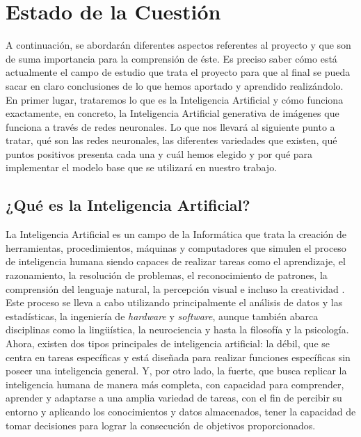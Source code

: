 \chapter{Estado de la Cuestión}
\label{cap:estadoDeLaCuestion}


A continuación, se abordarán diferentes aspectos referentes al proyecto y que son de suma importancia para la comprensión de éste. Es preciso saber cómo está actualmente el campo de estudio que trata el proyecto para que al final se pueda sacar en claro conclusiones de lo que hemos aportado y aprendido realizándolo.\\ 

En primer lugar, trataremos lo que es la Inteligencia Artificial y cómo funciona exactamente, en concreto, la Inteligencia Artificial generativa de imágenes que funciona a través de redes neuronales. Lo que nos llevará al siguiente punto a tratar, qué son las redes neuronales, las diferentes variedades que existen, qué puntos positivos presenta cada una y cuál hemos elegido y por qué para implementar el modelo base que se utilizará en nuestro trabajo. \\


\section{¿Qué es la Inteligencia Artificial?}

La Inteligencia Artificial es un campo de la Informática que trata la creación de herramientas, procedimientos, máquinas y computadores que simulen el proceso de inteligencia humana siendo capaces de realizar tareas como el aprendizaje, el razonamiento, la resolución de problemas, el reconocimiento de patrones, la comprensión del lenguaje natural, la percepción visual e incluso la creatividad \citep{GoogleIA}. Este proceso se lleva a cabo utilizando principalmente el análisis de datos y las estadísticas, la ingeniería de \textit{hardware} y \textit{software}, aunque también abarca disciplinas como la lingüística, la neurociencia y hasta la filosofía y la psicología.\\

Ahora, existen dos tipos principales de inteligencia artificial: la débil, que se centra en tareas específicas y está diseñada para realizar funciones específicas sin poseer una inteligencia general. Y, por otro lado, la fuerte, que busca replicar la inteligencia humana de manera más completa, con capacidad para comprender, aprender y adaptarse a una amplia variedad de tareas, con el fin de percibir su entorno y aplicando los conocimientos y datos almacenados, tener la capacidad de tomar decisiones para lograr la consecución de objetivos proporcionados.\\

